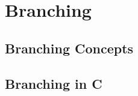 \chapter{Branching} %
\label{cha:branching}

\minitoc

\section{Branching Concepts} %
\label{sec:branching_concepts}









\clearpage
\section{Branching in C} %
\label{sec:branching_in_c}










